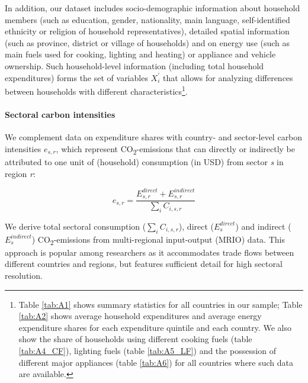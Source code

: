 \documentclass[12pt, a4paper]{article}
\begin{document}
In addition, our dataset includes socio-demographic information about household members (such as education, gender, nationality, main language, self-identified ethnicity or religion of household representatives), detailed spatial information (such as province, district or village of households) and on energy use (such as main fuels used for cooking, lighting and heating) or appliance and vehicle ownership. Such household-level information (including total household expenditures) forms the set of variables $X_{i}^{'}$ that allows for analyzing differences between households with different characteristics\footnote{Table \ref{tab:A1} shows summary statistics for all countries in our sample; Table \ref{tab:A2} shows average household expenditures and average energy expenditure shares for each expenditure quintile and each country. We also show the share of households using different cooking fuels (table \ref{tab:A4_CF}), lighting fuels (table \ref{tab:A5_LF}) and the possession of different major appliances (table \ref{tab:A6}) for all countries where such data are available.}.

\paragraph{Sectoral carbon intensities} We complement data on expenditure shares with country- and sector-level carbon intensities $e_{s,r}$, which represent CO\textsubscript{2}-emissions that can directly or indirectly be attributed to one unit of (household) consumption (in USD) from sector \textit{s} in region \textit{r}:

\begin{equation}
    e_{s,r} = \frac{E_{s,r}^{direct}+E_{s,r}^{indirect}}{\sum_{i} C_{i,s,r}}
\end{equation}

We derive total sectoral consumption ($\sum_{i} C_{i,s,r}$), direct ($E_{s}^{direct}$) and indirect ($E_{s}^{indirect}$) CO\textsubscript{2}-emissions from  multi-regional input-output (MRIO) data. This approach is popular among researchers as it accommodates trade flows between different countries and regions, but features sufficient detail for high sectoral resolution. 
\end{document}
